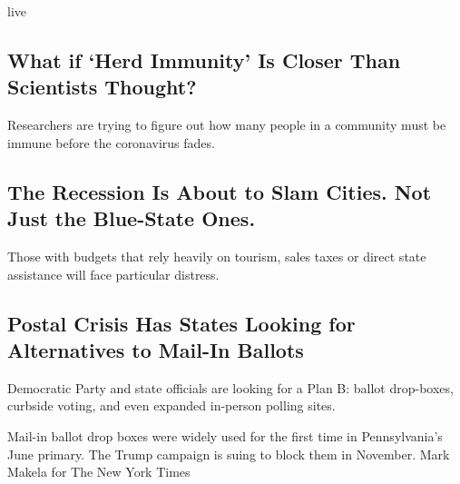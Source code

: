 live

\href{/2020/08/17/health/coronavirus-herd-immunity.html}{}

\hypertarget{what-if-herd-immunity-is-closer-than-scientists-thought}{%
\subsection{What if `Herd Immunity' Is Closer Than Scientists
Thought?}\label{what-if-herd-immunity-is-closer-than-scientists-thought}}

Researchers are trying to figure out how many people in a community must
be immune before the coronavirus fades.

\href{/2020/08/17/upshot/pandemic-recession-cities-fiscal-shortfall.html}{}

\href{/2020/08/17/upshot/pandemic-recession-cities-fiscal-shortfall.html}{}

\hypertarget{the-recession-is-about-to-slam-cities-not-just-the-blue-state-ones}{%
\subsection{The Recession Is About to Slam Cities. Not Just the
Blue-State
Ones.}\label{the-recession-is-about-to-slam-cities-not-just-the-blue-state-ones}}

Those with budgets that rely heavily on tourism, sales taxes or direct
state assistance will face particular distress.

\href{/2020/08/17/us/politics/postal-service-voting.html}{}

\hypertarget{postal-crisis-has-states-looking-for-alternatives-to-mail-in-ballots}{%
\subsection{Postal Crisis Has States Looking for Alternatives to Mail-In
Ballots}\label{postal-crisis-has-states-looking-for-alternatives-to-mail-in-ballots}}

Democratic Party and state officials are looking for a Plan B: ballot
drop-boxes, curbside voting, and even expanded in-person polling sites.

\href{/2020/08/17/us/politics/postal-service-voting.html}{}

Mail-in ballot drop boxes were widely used for the first time in
Pennsylvania's June primary. The Trump campaign is suing to block them
in November. Mark Makela for The New York Times

\href{/2020/08/17/us/politics/dejoy-postal-service-mail-in-voting.html}{}

